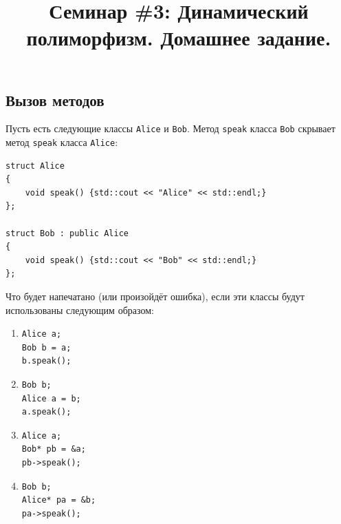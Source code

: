 \documentclass{article}
\begin{document}
\title{Семинар \#3: Динамический полиморфизм. Домашнее задание. \vspace{-5ex}}\date{}\maketitle

\subsection{Вызов методов}
Пусть есть следующие классы \texttt{Alice} и \texttt{Bob}. Метод \texttt{speak} класса \texttt{Bob} скрывает метод \texttt{speak} класса \texttt{Alice}:
\begin{lstlisting}
struct Alice 
{
    void speak() {std::cout << "Alice" << std::endl;}
};

struct Bob : public Alice 
{
    void speak() {std::cout << "Bob" << std::endl;}
};
\end{lstlisting}

\noindent Что будет напечатано (или произойдёт ошибка), если эти классы будут использованы следующим образом:

\begin{multicols}{2}
\begin{enumerate}
\item \begin{Verbatim}[commandchars=\\\{\}]
Alice a;
Bob b = a;
b.speak();
\end{Verbatim}

\item \begin{Verbatim}[commandchars=\\\{\}]
Bob b;
Alice a = b;
a.speak();
\end{Verbatim}
\end{enumerate}
\end{multicols}

\begin{multicols}{2}
\begin{enumerate}
\setcounter{enumi}{2}
\item \begin{Verbatim}[commandchars=\\\{\}]
Alice a;
Bob* pb = &a;
pb->speak();
\end{Verbatim}

\item \begin{Verbatim}[commandchars=\\\{\}]
Bob b;
Alice* pa = &b;
pa->speak();
\end{Verbatim}
\end{enumerate}
\end{multicols}
\end{document}
